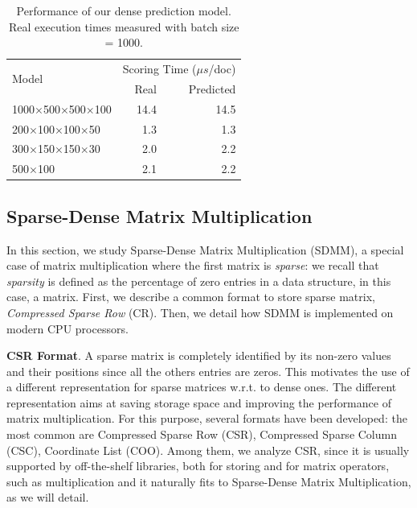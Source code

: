 \begin{table}[htb]
	\centering

	\begin{tabular}{lrr}
		\toprule
		\multirow{2}{*}{Model} &    \multicolumn{2}{c}{Scoring Time ($\mu s$/doc)} \\
		\cmidrule{2-3}
		 & Real & Predicted \\		%
		\midrule

		 1000$\times$500$\times$500$\times$100 & 14.4& 14.5 \\
		 200$\times$100$\times$100$\times$50 & 	1.3& 1.3 \\
		 300$\times$150$\times$150$\times$30 & 2.0 & 2.2 \\
		 500$\times$100 & 2.1 & 2.2\\
 		\bottomrule
	\end{tabular}
	\caption{Performance of our dense prediction model. Real execution times measured with batch size = 1000.}
	\label{table:est_vs_real_exec_t}
\end{table}

\subsection{Sparse-Dense Matrix Multiplication} 
\label{subsec:sdmm}
In this section, we study Sparse-Dense Matrix Multiplication (SDMM), a special case of matrix multiplication where the first matrix is \textit{sparse}: we recall that \textit{sparsity} is defined as the percentage of zero entries in a data structure, in this case, a matrix. First, we describe a common format to store sparse matrix, \textit{Compressed Sparse Row} (CR). Then, we detail how SDMM is implemented on modern CPU processors. 

\smallskip
\noindent \textbf{CSR Format}.
A sparse matrix is completely identified by its non-zero values and their positions since all the others entries are zeros. This motivates the use of a different representation for sparse matrices w.r.t. to dense ones. The different representation aims at saving storage space and improving the performance of matrix multiplication. For this purpose, several formats have been developed: the most common are Compressed Sparse Row (CSR), Compressed Sparse Column (CSC), Coordinate List (COO). Among them, we analyze CSR, since it is usually supported by off-the-shelf libraries, both for storing and for matrix operators, such as multiplication and it naturally fits to Sparse-Dense Matrix Multiplication, as we will detail.

